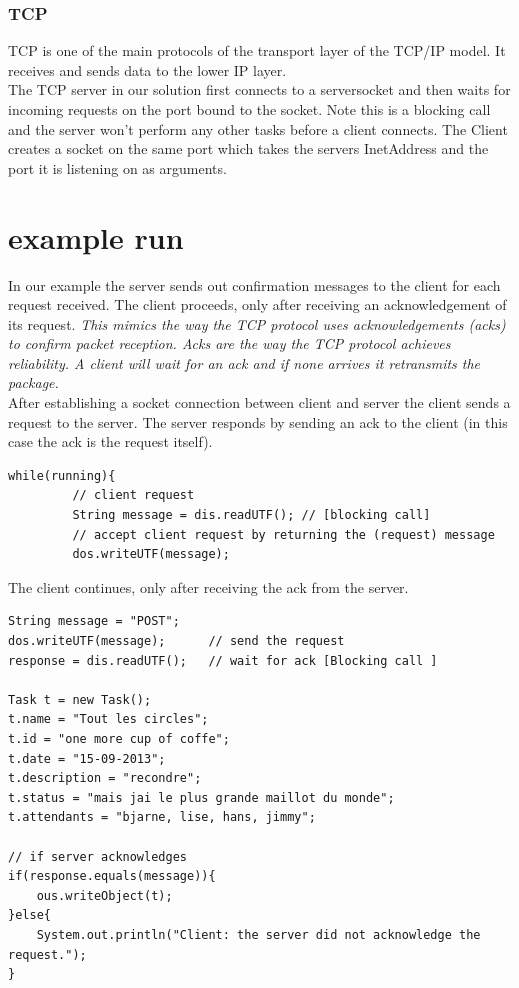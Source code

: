 \subsubsection{TCP}

TCP is one of the main protocols of the transport layer of the TCP/IP model. It receives and sends data to the lower IP layer. \\

The TCP server in our solution first connects to a serversocket and then waits for incoming requests on the port bound to the socket. Note this is a blocking call and the server won't perform any other tasks before a client connects. The Client creates a socket on the same port which takes the servers InetAddress and the port it is listening on as arguments. \\



\section{example run}
\label{tcp_example}

In our example the server sends out confirmation messages to the client for each request received. The client proceeds, only after receiving an acknowledgement of its request. \textit{This mimics the way the TCP protocol uses acknowledgements (acks) to confirm packet reception. Acks are the way the TCP protocol achieves \textit{reliability}. A client will wait for an ack and if none arrives it retransmits the package.}\\   

After establishing a socket connection between client and server the client sends a request to the server. The server responds by sending an ack to the client (in this case the ack is the request itself).
% 

\begin{lstlisting}[caption= server sends an ack to a request]
while(running){
         // client request
         String message = dis.readUTF(); // [blocking call]
         // accept client request by returning the (request) message
         dos.writeUTF(message);    

\end{lstlisting}

The client continues, only after receiving the ack from the server.
\begin{lstlisting}[caption=client request and wait for ack]
String message = "POST";
dos.writeUTF(message);		// send the request
response = dis.readUTF();	// wait for ack [Blocking call ]

Task t = new Task();
t.name = "Tout les circles";
t.id = "one more cup of coffe";
t.date = "15-09-2013";	
t.description = "recondre";
t.status = "mais jai le plus grande maillot du monde";
t.attendants = "bjarne, lise, hans, jimmy";

// if server acknowledges
if(response.equals(message)){
   	ous.writeObject(t);
}else{
   	System.out.println("Client: the server did not acknowledge the request.");
}
\end{lstlisting}

